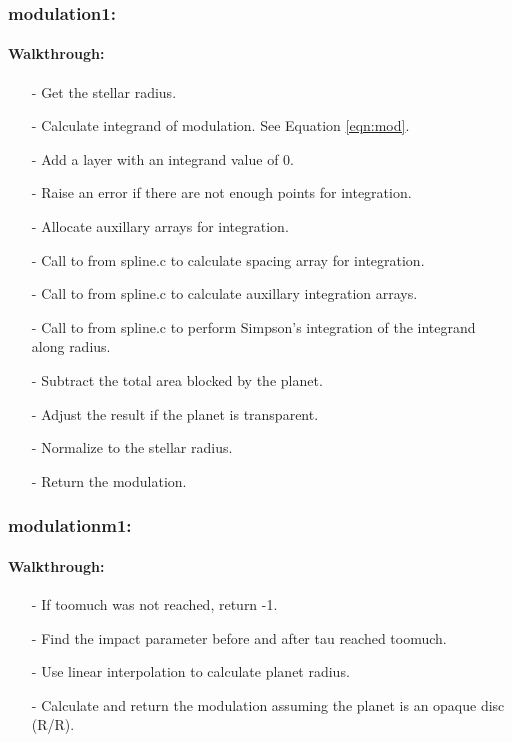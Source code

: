 \documentclass[letterpaper,12pt]{article}
\begin{document}
\subsubsection{modulation1:}
\paragraph{Walkthrough:}
\begin{enumerate}[leftmargin=10pt, noitemsep, parsep=0pt, topsep=0ex]
\item[-] Get the stellar radius.
\item[-] Calculate integrand of modulation. See Equation \ref{eqn:mod}.
\item[-] Add a layer with an integrand value of 0.
\item[-] Raise an error if there are not enough points for integration.
\item[-] Allocate auxillary arrays for integration.
\item[-] Call to  from spline.c to calculate spacing array for integration.
\item[-] Call to  from spline.c to calculate auxillary integration arrays.
\item[-] Call to  from spline.c to perform Simpson's integration of the integrand along radius.
\item[-] Subtract the total area blocked by the planet.
\item[-] Adjust the result if the planet is transparent.
\item[-] Normalize to the stellar radius.
\item[-] Return the modulation.
\end{enumerate}

\subsubsection{modulationm1:}
\paragraph{Walkthrough:}
\begin{enumerate}[leftmargin=10pt, noitemsep, parsep=0pt, topsep=0ex]
\item[-] If toomuch was not reached, return -1.
\item[-] Find the impact parameter before and after tau reached toomuch.
\item[-] Use linear interpolation to calculate planet radius.
\item[-] Calculate and return the modulation assuming the planet is an opaque disc (R/R\sb{*}).
\end{enumerate}
\end{document}
